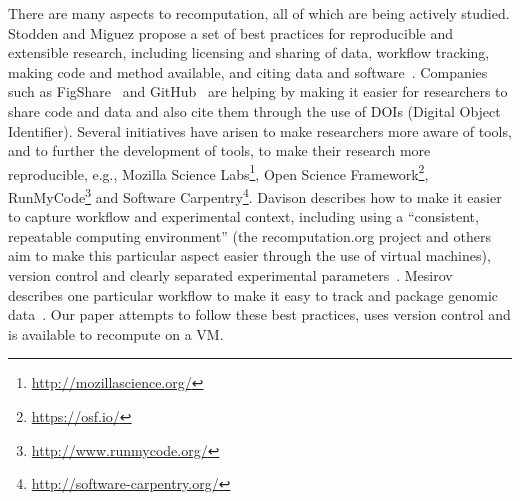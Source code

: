 There are many aspects to recomputation, all of which are being actively
studied. Stodden and Miguez propose a set of best practices for reproducible and
extensible research, including licensing and sharing of data, workflow tracking,
making code and method available, and citing data and
software~\cite{stodden:practices}. Companies such as
FigShare~\cite{figshare:citable} and GitHub~\cite{github:citable} are helping by
making it easier for researchers to share code and data and also cite them
through the use of DOIs (Digital Object Identifier). Several initiatives have
arisen to make researchers more aware of tools, and to further the development
of tools, to make their research more reproducible, e.g., Mozilla Science
Labs\footnote{\url{http://mozillascience.org/}}, Open Science
Framework\footnote{\url{https://osf.io/}},
RunMyCode\footnote{\url{http://www.runmycode.org/}} and Software
Carpentry\footnote{\url{http://software-carpentry.org/}}. Davison describes how
to make it easier to capture workflow and experimental context, including using
a ``consistent, repeatable computing environment'' (the recomputation.org
project and others~\cite{howe:reproducible} aim to make this particular aspect
easier through the use of virtual machines), version control and clearly
separated experimental parameters~\cite{davison:reproducibility}. Mesirov
describes one particular workflow to make it easy to track and package genomic
data~\cite{mesirov:accessible}. Our paper attempts to follow these best
practices, uses version control and is available to recompute on a VM.

%
%
